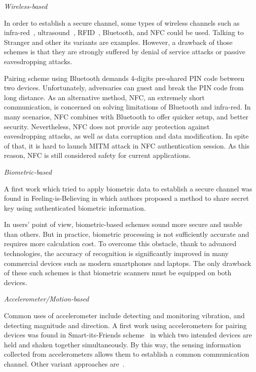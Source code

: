 \emph{Wireless-based}

In order to establish a secure channel, some types of wireless channels such as infra-red~\cite{5654588}, ultrasound~\cite{Mayrhofer06anauthentication}, RFID~\cite{Amariucai:2012aa}, Bluetooth, and NFC could be used. Talking to Stranger and other its variants \cite{5654588,Mayrhofer06anauthentication,4159919,Amariucai:2012aa} are examples. However, a drawback of those schemes is that they are strongly suffered by denial of service attacks or passive eavesdropping attacks. 

Pairing scheme using Bluetooth demands 4-digits pre-shared PIN code between two devices. Unfortunately, adversaries can guest and break the PIN code from long distance. As an alternative method, NFC, an extremely short communication, is concerned on solving limitations of Bluetooth and infra-red. In many scenarios, NFC combines with Bluetooth to offer quicker setup, and better security. Nevertheless, NFC does not provide any protection against eavesdropping attacks, as well as data corruption and data modification. In spite of that, it is hard to launch MITM attack in NFC authentication session. As this reason, NFC is still considered safety for current applications. 

\emph{Biometric-based}

A first work which tried to apply biometric data to establish a secure channel was found in Feeling-is-Believing \cite{Buhan_feelingis} in which authors proposed a method to share secret key using authenticated biometric information. 

In users' point of view, biometric-based schemes sound more secure and usable than others. But in practice, biometric processing is not sufficiently accurate and requires more calculation cost. To overcome this obstacle, thank to advanced technologies, the accuracy of recognition is significantly improved in many commercial devices such as modern smartphones and laptops. The only drawback of these such schemes is that biometric scanners must be equipped on both devices. 

\emph{Accelerometer/Motion-based}

Common uses of accelerometer include detecting and monitoring vibration, and detecting magnitude and direction. A first work using accelerometers for pairing devices was found in Smart-its-Friends scheme~\cite{Holmquist:2001kl} in which two intended devices are held and shaken together simultaneously. By this way, the sensing information collected from accelerometers allows them to establish a common communication channel. Other variant approaches are~\cite{Lester04areyou,Mayrhofer:2007oq,Studer:2011:DBS:2076732.2076780,Groza:2012:SSA:,Chong:2010:GUD:1851600.1851644, Chagnaadorj:2013aa}.

